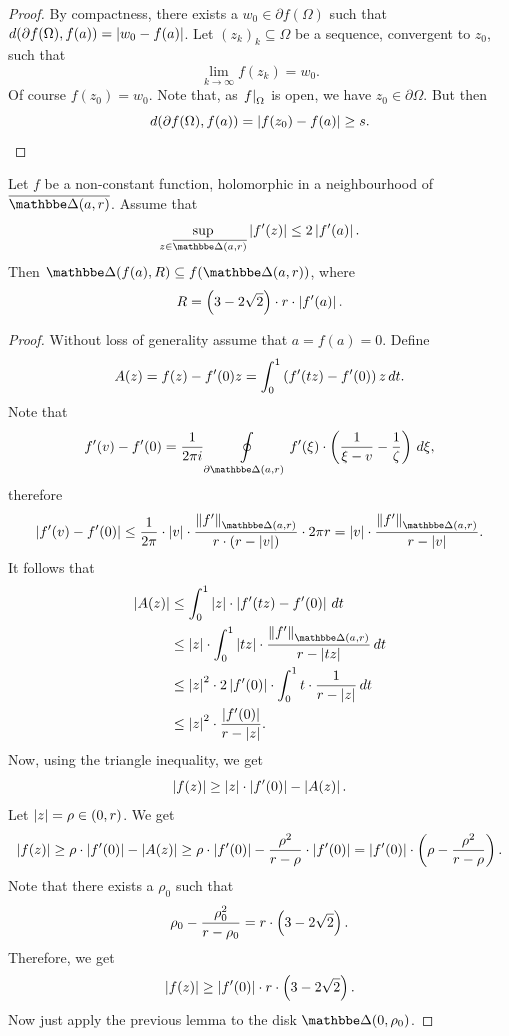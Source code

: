 \begin{proof}
By compactness, there exists a $w_0 \in \partial f(\Omega)$ such
that $d(\partial f(\Omega), f(a)) = \left\lvert w_0 - f(a)\right\rvert$. Let
$(z_k)_k \subseteq \Omega$ be a sequence, convergent to $z_0$, such
that
\[
\lim_{k \to \infty} f(z_k) = w_0.
\]
Of course $f(z_0) = w_0$. Note that, as $\left. f\right|_{\Omega}^{}$ is
open, we have $z_0 \in \partial \Omega$. But then
\[
d(\partial f(\Omega), f(a)) = \left\lvert f(z_0) - f(a)\right\rvert \geq s. \qedhere
\]
\end{proof}

\begin{lema}
\label{thm_hol:lm:bloch}
Let $f$ be a non-constant function, holomorphic in a neighbourhood
of $\oline{\dsk(a, r)}$. Assume that
\[
\sup_{z \in \oline{\dsk(a,r)}} \abs{f'(z)} \leq 2 \abs{f'(a)}.
\]
Then $\dsk(f(a), R) \subseteq f(\dsk(a, r))$, where
\[
R = \left(3 - 2 \sqrt{2}\right) \cdot r \cdot \left\lvert f'(a)\right\rvert.
\]
\end{lema}

\begin{proof}
Without loss of generality assume that $a = f(a) = 0$. Define
\[
A(z) = f(z) - f'(0) z = \int_0^1 \left(f'(tz) - f'(0)\right) z \,dt.
\]
Note that
\[
f'(v) - f'(0) =
\frac{1}{2 \pi i} \olint_{\partial \dsk(a, r)}
f'(\xi) \cdot \br{\frac{1}{\xi-v} - \frac{1}{\zeta}}\,d\xi,
\]
therefore
\[
\abs{f'(v) - f'(0)} \leq
\frac{1}{2 \pi} \cdot \abs{v} \cdot
\frac{\norm{f'}_{\dsk(a,r)}}{r \cdot (r - \abs{v})} \cdot 2 \pi r =
\abs{v} \cdot \frac{\norm{f'}_{\dsk(a,r)}}{r - \abs{v}}.
\]
It follows that
\begin{align*}
\abs{A(z)} &\leq
\int_0^1 \abs{z} \cdot \abs{f'(tz) - f'(0)}\,dt
\\
&\leq
\abs{z} \cdot \int_0^1
\abs{tz} \cdot \frac{\norm{f'}_{\dsk(a,r)}}{r - \abs{tz}}\,dt
\\
&\leq
\abs{z}^2 \cdot 2 \abs{f'(0)} \cdot \int_0^1
t \cdot \frac{1}{r - \abs{z}}\,dt
\\
&\leq
\abs{z}^2 \cdot \frac{\abs{f'(0)}}{r - \abs{z}}.
\end{align*}
Now, using the triangle inequality, we get
\[
\left\lvert f(z)\right\rvert \geq \left\lvert z\right\rvert \cdot \left\lvert f'(0)\right\rvert - \left\lvert A(z)\right\rvert.
\]
Let $\left\lvert z\right\rvert = \rho \in (0, r)$. We get
\[
\left\lvert f(z)\right\rvert \geq
\rho \cdot \left\lvert f'(0)\right\rvert - \left\lvert A(z)\right\rvert \geq
\rho \cdot \left\lvert f'(0)\right\rvert -
\frac{\rho^2}{r - \rho} \cdot \left\lvert f'(0)\right\rvert =
\left\lvert f'(0)\right\rvert \cdot \left(\rho - \frac{\rho^2}{r - \rho}\right).
\]
Note that there exists a $\rho_0$ such that
\[
\rho_0 - \frac{\rho_0^2}{r - \rho_0} =
r \cdot \left(3 - 2 \sqrt{2}\right).
\]
Therefore, we get
\[
\left\lvert f(z)\right\rvert \geq \left\lvert f'(0)\right\rvert \cdot r \cdot \left(3 - 2 \sqrt{2}\right).
\]
Now just apply the previous lemma to the disk $\dsk(0, \rho_0)$.
\end{proof}

